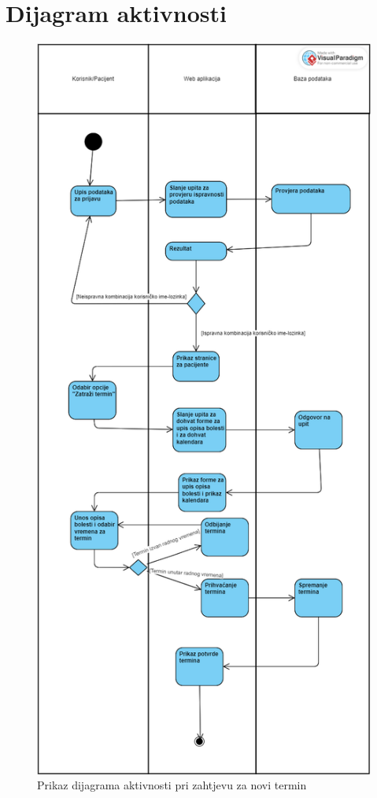 			\eject
			
		\section{Dijagram aktivnosti}
			
			\begin{figure}[H]
				\includegraphics[scale=0.35]{slike/DijagramAktivnosti1.PNG} %
				\centering
				\caption{Prikaz dijagrama aktivnosti pri zahtjevu za novi termin}
				\label{fig:promjene}
			\end{figure}
			
